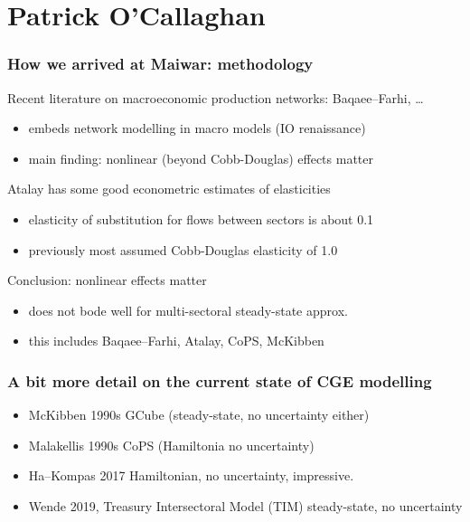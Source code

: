 \documentclass[handout,english]{beamer}
\begin{document}
\section{Patrick O'Callaghan}
\begin{frame}
  \frametitle{How we arrived at Maiwar: methodology}
  Recent literature on macroeconomic production networks: Baqaee--Farhi, \dots
  \begin{itemize}
    \item embeds network modelling in macro models (IO renaissance)
    \item main finding: nonlinear (beyond Cobb-Douglas) effects matter
  \end{itemize}
  Atalay has some good econometric estimates of elasticities
  \begin{itemize}
    \item elasticity of substitution for flows between sectors is about 0.1
    \item previously most assumed Cobb-Douglas elasticity of 1.0
  \end{itemize}
  Conclusion: nonlinear effects matter
  \begin{itemize}
    \item {\color{patrickcolor3}
      does not bode well for multi-sectoral steady-state approx.}
    \item this includes Baqaee--Farhi, Atalay, CoPS, McKibben
  \end{itemize}
\end{frame}
\begin{frame}
  \frametitle{A bit more detail on the current state of CGE modelling}
  \begin{itemize}
      \item McKibben 1990s GCube (steady-state, no uncertainty either)
      \item Malakellis 1990s CoPS (Hamiltonia no uncertainty)
      \item Ha--Kompas 2017 Hamiltonian, no uncertainty, impressive.
      \item Wende 2019, Treasury Intersectoral Model (TIM) steady-state, no uncertainty
  \end{itemize}
\end{frame}
\end{document}
